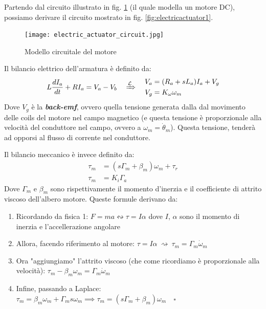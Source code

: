 Partendo dal circuito illustrato in fig. \ref{fig:electricactuatorcircuit} (il quale modella un motore DC), possiamo derivare il circuito mostrato in fig. \ref{fig:electricactuator1}.

\begin{figure}[th!]
	\centering
	\texttt{[image: electric\_actuator\_circuit.jpg]}
	\caption{Modello circuitale del motore}
	\label{fig:electricactuatorcircuit}
\end{figure}

Il bilancio elettrico dell'armatura è definito da:
\begin{align}\label{eq:armature_balance}
L\frac{dI_a}{dt} + RI_a = V_a - V_b
\quad
\xRightarrow{\mathcal {L}}
\quad
\begin{aligned}
V_a &= (R_a + sL_a)I_a + V_g\\
V_g &= K_{\omega} \omega_m
\end{aligned}
\end{align}
Dove $V_g$ è la \textbf{\textit{back-emf}}, ovvero quella tensione generata dalla dal movimento delle coils del motore nel campo magnetico (e questa tensione è proporzionale alla velocità del conduttore nel campo, ovvero a $\omega_m = \dot{\theta}_m$). Questa tensione, tenderà ad opporsi al flusso di corrente nel conduttore.

Il bilancio meccanico è invece definito da:
\begin{align}
\tau_m &= (s\Gamma_m + \beta_m)\omega_m + \tau_r \\
\tau_m &= K_i\Gamma_a
\end{align}
Dove $\Gamma_m$ e $\beta_m$ sono rispettivamente il momento d'inerzia e il coefficiente di attrito viscoso dell'albero motore. Queste formule derivano da:
\begin{enumerate}
	\item Ricordando da fisica 1: $F = ma \leftrightsquigarrow \tau = I\alpha$ dove $I$, $\alpha$ sono il momento di inerzia e l'accellerazione angolare
	\item Allora, facendo riferimento al motore: $\tau = I\alpha \ \rightsquigarrow \ \tau_m = \Gamma_m\dot{\omega}_m$
	\item Ora "aggiungiamo" l'attrito viscoso (che come ricordiamo è proporzionale alla velocità): $\tau_m - \beta_m\omega_m = \Gamma_m\dot{\omega}_m$
	\item Infine, passando a Laplace: $\tau_m = \beta_m\omega_m + \Gamma_m s\omega_m \implies \tau_m = (s\Gamma_m + \beta_m)\omega_m \quad \square$ 
\end{enumerate}


